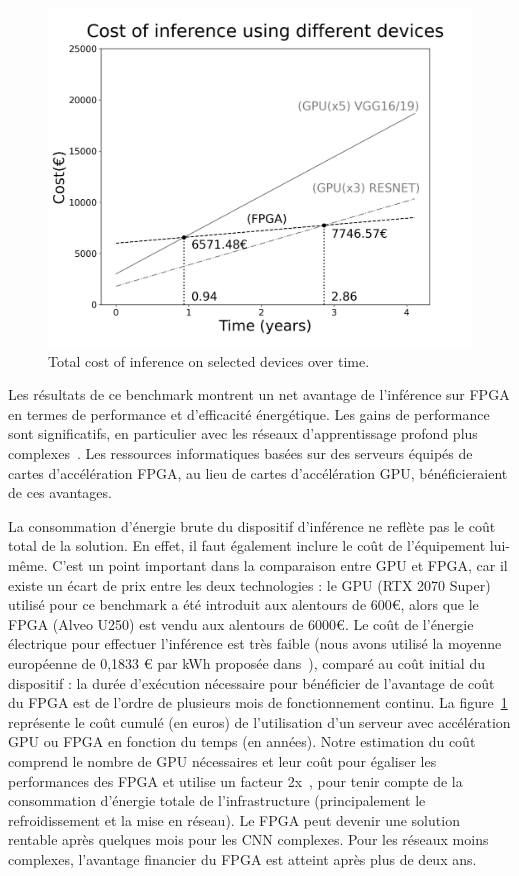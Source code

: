 \begin{figure}[t]
\centering
\includegraphics[scale=0.2]{4_Chapitre4/figures/characterization/cost_devices_time.png}
\caption{Total cost of inference on selected devices over time.}
\label{figure:herofake-cost-over-time}
\end{figure}

Les résultats de ce benchmark montrent un net avantage de l'inférence sur FPGA en termes de performance et d'efficacité énergétique. Les gains de performance sont significatifs, en particulier avec les réseaux d'apprentissage profond plus complexes~\cite{8782524}. Les ressources informatiques basées sur des serveurs équipés de cartes d'accélération FPGA, au lieu de cartes d'accélération GPU, bénéficieraient de ces avantages.

La consommation d'énergie brute du dispositif d'inférence ne reflète pas le coût total de la solution. En effet, il faut également inclure le coût de l'équipement lui-même. C'est un point important dans la comparaison entre GPU et FPGA, car il existe un écart de prix entre les deux technologies : le GPU (RTX 2070 Super) utilisé pour ce benchmark a été introduit aux alentours de 600€, alors que le FPGA (Alveo U250) est vendu aux alentours de 6000€. Le coût de l'énergie électrique pour effectuer l'inférence est très faible (nous avons utilisé la moyenne européenne de 0,1833 € par kWh proposée dans~\cite{energy-price}), comparé au coût initial du dispositif : la durée d'exécution nécessaire pour bénéficier de l'avantage de coût du FPGA est de l'ordre de plusieurs mois de fonctionnement continu. La figure~\ref{figure:herofake-cost-over-time} représente le coût cumulé (en euros) de l'utilisation d'un serveur avec accélération GPU ou FPGA en fonction du temps (en années). Notre estimation du coût comprend le nombre de GPU nécessaires et leur coût pour égaliser les performances des FPGA et utilise un facteur 2x~\cite{shehabiUnitedStatesData2016}, pour tenir compte de la consommation d'énergie totale de l'infrastructure (principalement le refroidissement et la mise en réseau). Le FPGA peut devenir une solution rentable après quelques mois pour les CNN complexes. Pour les réseaux moins complexes, l'avantage financier du FPGA est atteint après plus de deux ans.

